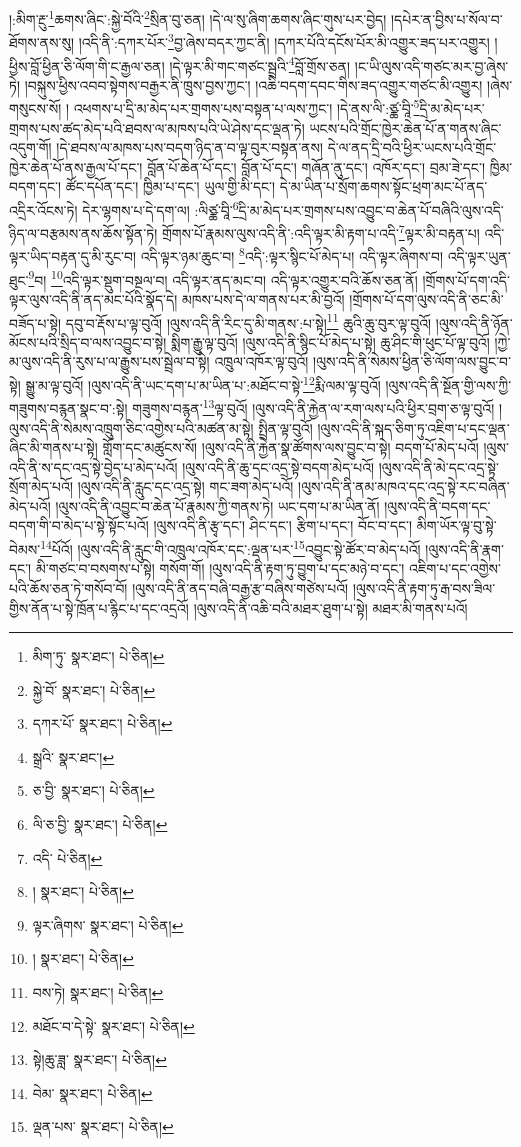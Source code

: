 །:མིག་རྔུ་\footnote{མིག་ཏུ་  སྣར་ཐང་།  པེ་ཅིན། }ཆགས་ཞིང་:སྐྱེ་བོའི་\footnote{སྐྱེ་བོ་  སྣར་ཐང་།  པེ་ཅིན། }སྲིན་བུ་ཅན། །དེ་ལ་སུ་ཞིག་ཆགས་ཞིང་གུས་པར་བྱེད། །དཔེར་ན་བྱིས་པ་སོལ་བ་ཐོགས་ནས་སུ། །འདི་ནི་:དཀར་པོར་\footnote{དཀར་པོ་  སྣར་ཐང་།  པེ་ཅིན། }བྱ་ཞེས་བདར་ཀྱང་ནི། །དཀར་པོའི་དངོས་པོར་མི་འགྱུར་ཟད་པར་འགྱུར། །ཕྱིས་བློ་ཕྱིན་ཅི་ལོག་གི་ང་རྒྱལ་ཅན། །དེ་ལྟར་མི་གང་གཙང་སྦྲའི་\footnote{སྒྲའི་  སྣར་ཐང་། }བློ་གྲོས་ཅན། །ང་ཡི་ལུས་འདི་གཙང་མར་བྱ་ཞེས་ཏེ། །བསྐུས་ཕྱིས་འབབ་སྟེགས་བརྒྱར་ནི་ཁྲུས་བྱས་ཀྱང་། །འཆི་བདག་དབང་གིས་ཟད་འགྱུར་གཙང་མི་འགྱུར། །ཞེས་གསུངས་སོ། །
འཕགས་པ་དྲི་མ་མེད་པར་གྲགས་པས་བསྟན་པ་ལས་ཀྱང་། །དེ་ནས་ལི་:ཙྪ་བཱི་\footnote{ཅ་བྱི་  སྣར་ཐང་།  པེ་ཅིན། }དྲི་མ་མེད་པར་གྲགས་པས་ཚད་མེད་པའི་ཐབས་ལ་མཁས་པའི་ཡེ་ཤེས་དང་ལྡན་ཏེ། ཡངས་པའི་གྲོང་ཁྱེར་ཆེན་པོ་ན་གནས་ཞིང་འདུག་གོ། །དེ་ཐབས་ལ་མཁས་པས་བདག་ཉིད་ན་བ་ལྟ་བུར་བསྟན་ནས། དེ་ལ་ནད་དྲི་བའི་ཕྱིར་ཡངས་པའི་གྲོང་ཁྱེར་ཆེན་པོ་ནས་རྒྱལ་པོ་དང་། བློན་པོ་ཆེན་པོ་དང་། བློན་པོ་དང་། གཞོན་ནུ་དང་། འཁོར་དང་། བྲམ་ཟེ་དང་། ཁྱིམ་བདག་དང་། ཚོང་དཔོན་དང་། ཁྱིམ་པ་དང་། ཡུལ་གྱི་མི་དང་། དེ་མ་ཡིན་པ་སྲོག་ཆགས་སྟོང་ཕྲག་མང་པོ་ནད་འདྲིར་འོངས་ཏེ། དེར་ལྷགས་པ་དེ་དག་ལ། :ལིཙྪ་བཱི་\footnote{ལི་ཅ་བྱི་  སྣར་ཐང་།  པེ་ཅིན། }དྲི་མ་མེད་པར་གྲགས་པས་འབྱུང་བ་ཆེན་པོ་བཞིའི་ལུས་འདི་ཉིད་ལ་བརྩམས་ནས་ཆོས་སྟོན་ཏེ། གྲོགས་པོ་རྣམས་ལུས་འདི་ནི་:འདི་ལྟར་མི་རྟག་པ་འདི་\footnote{འདི་  པེ་ཅིན། }ལྟར་མི་བརྟན་པ། འདི་ལྟར་ཡིད་བརྟན་དུ་མི་རུང་བ། འདི་ལྟར་ཉམ་ཆུང་བ། \footnote{།    སྣར་ཐང་།  པེ་ཅིན། }འདི་:ལྟར་སྙིང་པོ་མེད་པ། འདི་ལྟར་ཞིགས་བ། འདི་ལྟར་ཡུན་ཐུང་\footnote{ལྟར་ཞིགས་  སྣར་ཐང་།  པེ་ཅིན། }བ། \footnote{།    སྣར་ཐང་།  པེ་ཅིན། }འདི་ལྟར་སྡུག་བསྔལ་བ། འདི་ལྟར་ནད་མང་བ། འདི་ལྟར་འགྱུར་བའི་ཆོས་ཅན་ནོ། །གྲོགས་པོ་དག་འདི་ལྟར་ལུས་འདི་ནི་ནད་མང་པོའི་སྣོད་དེ། མཁས་པས་དེ་ལ་གནས་པར་མི་བྱའོ། །གྲོགས་པོ་དག་ལུས་འདི་ནི་ཅང་མི་བཟོད་པ་སྟེ། དབུ་བ་རྡོས་པ་ལྟ་བུའོ། །ལུས་འདི་ནི་རིང་དུ་མི་གནས་:པ་སྟེ།\footnote{བས་ཏེ།  སྣར་ཐང་།  པེ་ཅིན། } ཆུའི་ཆུ་བུར་ལྟ་བུའོ། །ལུས་འདི་ནི་ཉོན་མོངས་པའི་སྲིད་བ་ལས་འབྱུང་བ་སྟེ། སྨིག་རྒྱུ་ལྟ་བུའོ། །ལུས་འདི་ནི་སྙིང་པོ་མེད་པ་སྟེ། ཆུ་ཤིང་གི་ཕུང་པོ་ལྟ་བུའོ། །ཀྱེ་མ་ལུས་འདི་ནི་རུས་པ་ལ་རྒྱུས་པས་སྦྲེལ་བ་སྟེ། འཁྲུལ་འཁོར་ལྟ་བུའོ། །ལུས་འདི་ནི་སེམས་ཕྱིན་ཅི་ལོག་ལས་བྱུང་བ་སྟེ། སྒྱུ་མ་ལྟ་བུའོ། །ལུས་འདི་ནི་ཡང་དག་པ་མ་ཡིན་པ་:མཐོང་བ་སྟེ་\footnote{མཐོང་བ་དེ་སྟེ་  སྣར་ཐང་།  པེ་ཅིན། }རྨི་ལམ་ལྟ་བུའོ། །ལུས་འདི་ནི་སྔོན་གྱི་ལས་ཀྱི་གཟུགས་བརྙན་སྣང་བ་:སྟེ། གཟུགས་བརྙན་\footnote{སྟེ།ཆུ་ཟླ་  སྣར་ཐང་།  པེ་ཅིན། }ལྟ་བུའོ། །ལུས་འདི་ནི་རྐྱེན་ལ་རག་ལས་པའི་ཕྱིར་བྲག་ཅ་ལྟ་བུའོ། །ལུས་འདི་ནི་སེམས་འཁྲུག་ཅིང་འགྱེས་པའི་མཚན་མ་སྟེ། སྤྲིན་ལྟ་བུའོ། །ལུས་འདི་ནི་སྐད་ཅིག་ཏུ་འཇིག་པ་དང་ལྡན་ཞིང་མི་གནས་པ་སྟེ། གློག་དང་མཚུངས་སོ། །ལུས་འདི་ནི་རྐྱེན་སྣ་ཚོགས་ལས་བྱུང་བ་སྟེ། བདག་པོ་མེད་པའོ། །ལུས་འདི་ནི་ས་དང་འདྲ་སྟེ་བྱེད་པ་མེད་པའོ། །ལུས་འདི་ནི་ཆུ་དང་འདྲ་སྟེ་བདག་མེད་པའོ། །ལུས་འདི་ནི་མེ་དང་འདྲ་སྟེ་སྲོག་མེད་པའོ། །ལུས་འདི་ནི་རླུང་དང་འདྲ་སྟེ། གང་ཟག་མེད་པའོ། །ལུས་འདི་ནི་ནམ་མཁའ་དང་འདྲ་སྟེ་རང་བཞིན་མེད་པའོ། །ལུས་འདི་ནི་འབྱུང་བ་ཆེན་པོ་རྣམས་ཀྱི་གནས་ཏེ། ཡང་དག་པ་མ་ཡིན་ནོ། །ལུས་འདི་ནི་བདག་དང་བདག་གི་བ་མེད་པ་སྟེ་སྟོང་པའོ། །ལུས་འདི་ནི་རྩྭ་དང་། ཤིང་དང་། རྩིག་པ་དང་། བོང་བ་དང་། མིག་ཡོར་ལྟ་བུ་སྟེ་བེམས་\footnote{བེམ་  སྣར་ཐང་།  པེ་ཅིན། }པོའོ། །ལུས་འདི་ནི་རླུང་གི་འཁྲུལ་འཁོར་དང་:ལྡན་པར་\footnote{ལྡན་པས་  སྣར་ཐང་།  པེ་ཅིན། }འབྱུང་སྟེ་ཚོར་བ་མེད་པའོ། །ལུས་འདི་ནི་རྣག་དང་། མི་གཙང་བ་བསགས་པ་སྟེ། གསོག་གོ། །ལུས་འདི་ནི་རྟག་ཏུ་བྱུག་པ་དང་མཉེ་བ་དང་། འཇིག་པ་དང་འགྱེས་པའི་ཆོས་ཅན་ཏེ་གསོབ་བོ། །ལུས་འདི་ནི་ནད་བཞི་བརྒྱ་རྩ་བཞིས་གཙེས་པའོ། །ལུས་འདི་ནི་རྟག་ཏུ་རྒ་བས་ཟིལ་གྱིས་ནོན་པ་སྟེ་ཁྲོན་པ་རྙིང་པ་དང་འདྲའོ། །ལུས་འདི་ནི་འཆི་བའི་མཐར་ཐུག་པ་སྟེ། མཐར་མི་གནས་པའོ། 